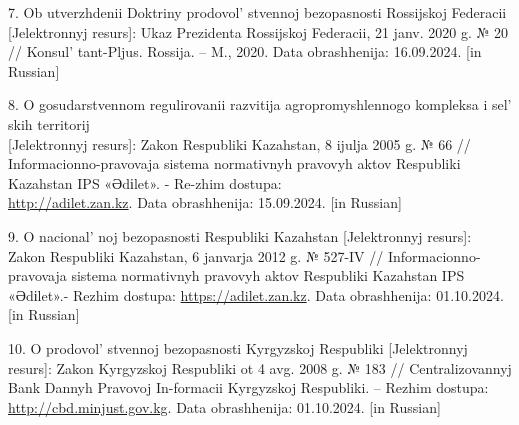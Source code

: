 \begin{references}
7. Ob utverzhdenii Doktriny prodovol' stvennoj
bezopasnosti Rossijskoj Federacii {[}Jelektronnyj resurs{]}: Ukaz
Prezidenta Rossijskoj Federacii, 21 janv. 2020 g. № 20 //
Konsul' tant-Pljus. Rossija. -- M., 2020. Data
obrashhenija: 16.09.2024. {[}in Russian{]}

8. O gosudarstvennom regulirovanii razvitija agropromyshlennogo
kompleksa i sel' skih territorij \\{[}Jelektronnyj
resurs{]}: Zakon Respubliki Kazahstan, 8 ijulja 2005 g. № 66 //
Informacionno-pravovaja sistema normativnyh pravovyh aktov Respubliki
Kazahstan IPS «Әdіlet». - Re-zhim dostupa:\\
\href{http://adilet.zan.kz/rus/docs/Z050000066}{http://adilet.zan.kz}. Data obrashhenija: 15.09.2024.
{[}in Russian{]}

9. O nacional' noj bezopasnosti Respubliki Kazahstan
{[}Jelektronnyj resurs{]}: Zakon Respubliki Kazahstan, 6 janvarja 2012
g. № 527-IV // Informacionno-pravovaja sistema normativnyh pravovyh
aktov Respubliki Kazahstan IPS «Әdіlet».- Rezhim dostupa:
\href{https://adilet.zan.kz/rus/docs/Z1200000527}{https://adilet.zan.kz}. Data obrashhenija:
01.10.2024. \\{[}in Russian{]}

10. O prodovol' stvennoj bezopasnosti Kyrgyzskoj
Respubliki {[}Jelektronnyj resurs{]}: Zakon Kyrgyzskoj Respubliki ot 4
avg. 2008 g. № 183 // Centralizovannyj Bank Dannyh Pravovoj In-formacii
Kyrgyzskoj Respubliki. -- Rezhim dostupa:
\href{http://cbd.minjust.gov.kg/act/view/ru-ru/202397?cl=ru-ru}{http://cbd.minjust.gov.kg}. Data
obrashhenija: 01.10.2024. {[}in Russian{]}
\end{references}

